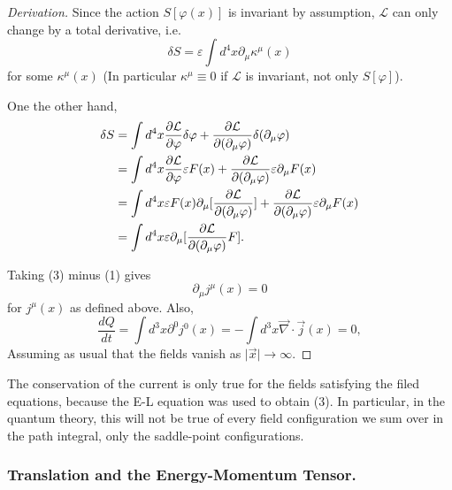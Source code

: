 \begin{proof}[Derivation]
    
    \qquad Since the action $S[\varphi(x)]$ is invariant by assumption, $\mathcal{L}$ can only change by a total derivative, i.e.
            \begin{equation} \delta S= \varepsilon \int d^4 x \partial_\mu \kappa^\mu(x)\end{equation}
    for some $\kappa^\mu(x)$ (In particular $\kappa^\mu \equiv 0$ if $\mathcal{L}$ is invariant, not only $S[\varphi]$).

    \qquad One the other hand,
            \begin{equation}
            \begin{aligned}
            \delta S &= \int d^4 x \frac{\partial \mathcal{L}}{\partial \varphi} \delta \varphi + \frac{\partial \mathcal{L}}{\partial(\partial_\mu \varphi)} \delta (\partial_\mu \varphi) \\
                &=\int d^4 x \frac{\partial \mathcal{L}}{\partial \varphi} \varepsilon F(x)+ \frac{\partial \mathcal{L}}{\partial(\partial_\mu \varphi)} \varepsilon \partial_\mu F(x)\\
                &=\int d^4 x  \varepsilon F(x) \partial_\mu[\frac{\partial \mathcal{L}}{\partial(\partial_\mu \varphi)}]+ \frac{\partial \mathcal{L}}{\partial(\partial_\mu \varphi)} \varepsilon \partial_\mu F(x) \\
                &=\int d^4 x \varepsilon \partial_\mu [ \frac{\partial \mathcal{L}}{\partial(\partial_\mu \varphi)} F].
            \end{aligned}
            \end{equation}
    
    \qquad Taking (3) minus (1) gives 
            $$\partial_\mu j^\mu(x)=0$$
     for $j^\mu(x)$ as defined above. Also,
        $$\frac{dQ}{dt} = \int d^3 x \partial^0 j^0(x) = -\int d^3 x \vec{\nabla} \cdot \vec{j}(x) = 0,$$
    Assuming as usual that the fields vanish as $\vert \vec{x} \vert \to \infty$.
\end{proof}

\begin{remark}
    The conservation of the current is only true for the fields satisfying the filed equations, because the E-L equation was used to 
obtain (3). In particular, in the quantum theory, this will not be true of every field configuration we sum over in the path integral, only the 
saddle-point configurations.
\end{remark}

\subsubsection{Translation and the Energy-Momentum Tensor.}


